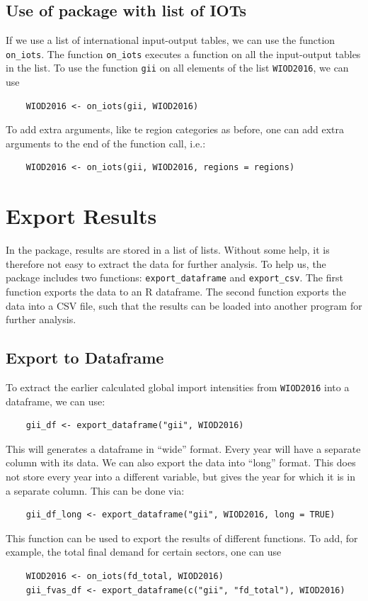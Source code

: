 \documentclass[10pt,a4paper]{paper}
\begin{document}
	\subsection{Use of package with list of IOTs}
	If we use a list of international input-output tables, we can use the function \texttt{on\_iots}. The function \texttt{on\_iots} executes a function on all the input-output tables in the list. To use the function \texttt{gii} on all elements of the list \texttt{WIOD2016}, we can use
	\begin{Verbatim}
	WIOD2016 <- on_iots(gii, WIOD2016)
	\end{Verbatim}
	To add extra arguments, like te region categories as before, one can add extra arguments to the end of the function call, i.e.:
	\begin{Verbatim}
	WIOD2016 <- on_iots(gii, WIOD2016, regions = regions)
	\end{Verbatim}
	
	\section{Export Results}
	In the package, results are stored in a list of lists. Without some help, it is therefore not easy to extract the data for further analysis. To help us, the package includes two functions: \texttt{export\_dataframe} and \texttt{export\_csv}. The first function exports the data to an R dataframe. The second function exports the data into a CSV file, such that the results can be loaded into another program for further analysis.
	\subsection{Export to Dataframe}
	
	To extract the earlier calculated global import intensities from \texttt{WIOD2016} into a dataframe, we can use:
	\begin{Verbatim}
	gii_df <- export_dataframe("gii", WIOD2016)
	\end{Verbatim}
	This will generates a dataframe in ``wide'' format. Every year will have a separate column with its data. We can also export the data into ``long'' format. This does not store every year into a different variable, but gives the year for which it is in a separate column. This can be done via:
	\begin{Verbatim}
	gii_df_long <- export_dataframe("gii", WIOD2016, long = TRUE)
	\end{Verbatim}
	This function can be used to export the results of different functions. To add, for example, the total final demand for certain sectors, one can use
	\begin{Verbatim}
	WIOD2016 <- on_iots(fd_total, WIOD2016)
	gii_fvas_df <- export_dataframe(c("gii", "fd_total"), WIOD2016)
	\end{Verbatim}
		
\end{document}

